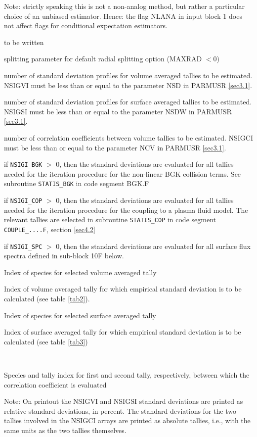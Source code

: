 \begin{list}{ }{}
Note: strictly speaking this is not a non-analog method, but rather a
particular choice of an unbiased estimator. Hence: the flag
NLANA in input block 1 does not affect flags for conditional
expectation estimators.
\item[{\bf WMINL }]
to be written

\item[{\bf SPLPAR }]
splitting parameter for default radial splitting option (MAXRAD $<0$)
\item[{\bf NSIGVI }]
number of standard deviation profiles for volume averaged tallies
to be estimated.
NSIGVI must be less than or equal to the parameter NSD in PARMUSR
\ref{sec3.1}.
\item[{\bf NSIGSI }]
number of standard deviation profiles for surface averaged tallies
to be estimated.
NSIGSI must be less than or equal to the parameter NSDW in PARMUSR
\ref{sec3.1}.
\item[{\bf NSIGCI }]
number of correlation coefficients between volume tallies
to be estimated.
NSIGCI must be less than or equal to the parameter NCV in PARMUSR
\ref{sec3.1}.
\item[{\bf NSIGI\_BGK }]
if \verb|NSIGI_BGK| $>$ 0, then the standard deviations are
evaluated for all tallies needed for the iteration procedure for
the non-linear BGK collision terms. See subroutine
\verb|STATIS_BGK| in code segment BGK.F
\item[{\bf NSIGI\_COP }]
if \verb|NSIGI_COP| $>$ 0, then the standard deviations are
evaluated for all tallies needed for the iteration procedure for
the coupling to a plasma fluid model. The relevant tallies are
selected in subroutine \verb|STATIS_COP| in code segment
\verb|COUPLE_....F|, section \ref{sec4.2}
\item[{\bf NSIGI\_SPC }]
if \verb|NSIGI_SPC| $>$ 0, then the standard deviations are
evaluated for all surface flux spectra defined in sub-block 10F below.
\item[{\bf IGH }]
Index of species for selected volume averaged tally
\item[{\bf IIH }]
Index of volume averaged tally for which empirical standard
deviation is to be calculated (see table \ref{tab2}).
\item[{\bf IGHW }]
Index of species for selected surface averaged tally
\item[{\bf IIHW }]
Index of surface averaged tally for which empirical standard
deviation is to be calculated (see table \ref{tab3})
\item[{\bf IGHC1 IIHC1 IGHC2 IIHC2 }]~

Species and tally index for first and second tally, respectively,
between which the correlation coefficient is evaluated
\end{list}

Note: On printout the NSIGVI and NSIGSI standard deviations are
printed as relative standard deviations, in percent. The standard
deviations for the two tallies involved in the NSIGCI arrays are
printed as absolute tallies, i.e., with the same units as the two
tallies themselves.
